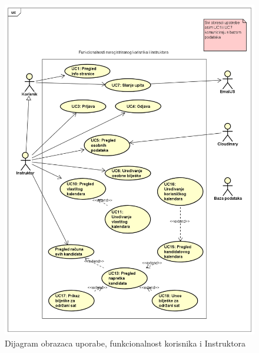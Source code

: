   \begin{figure}[H]
		\includegraphics[width=\textwidth]{slike/UseCase Diagram2.png}
		\centering
		\vspace{-1cm}
		\caption{Dijagram obrazaca uporabe, funkcionalnost korisnika i Instruktora}
		\label{fig:promjene}
	\end{figure}

